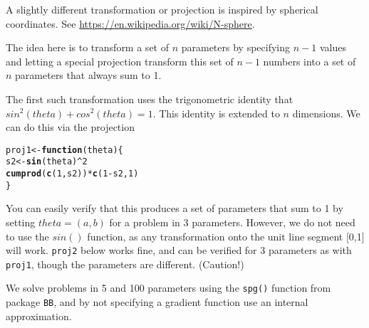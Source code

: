 \documentclass[11pt]{article}\usepackage[]{graphicx}\usepackage[]{color}
\makeatletter
\newcommand{\hlnum}[1]{\textcolor[rgb]{0.686,0.059,0.569}{#1}}%
\newcommand{\hlopt}[1]{\textcolor[rgb]{0,0,0}{#1}}%
\newcommand{\hlstd}[1]{\textcolor[rgb]{0.345,0.345,0.345}{#1}}%
\newcommand{\hlkwa}[1]{\textcolor[rgb]{0.161,0.373,0.58}{\textbf{#1}}}%
\newcommand{\hlkwb}[1]{\textcolor[rgb]{0.69,0.353,0.396}{#1}}%
\newcommand{\hlkwc}[1]{\textcolor[rgb]{0.333,0.667,0.333}{#1}}%
\newcommand{\hlkwd}[1]{\textcolor[rgb]{0.737,0.353,0.396}{\textbf{#1}}}%
\newenvironment{kframe}{%
 \def\at@end@of@kframe{}%
 \ifinner\ifhmode%
  \def\at@end@of@kframe{\end{minipage}}%
  \begin{minipage}{\columnwidth}%
 \fi\fi%
 \def\FrameCommand##1{\hskip\@totalleftmargin \hskip-\fboxsep
 \colorbox{shadecolor}{##1}\hskip-\fboxsep
     \hskip-\linewidth \hskip-\@totalleftmargin \hskip\columnwidth}%
 \MakeFramed {\advance\hsize-\width
   \@totalleftmargin\z@ \linewidth\hsize
   \@setminipage}}%
 {\par\unskip\endMakeFramed%
 \at@end@of@kframe}
\newenvironment{knitrout}{}{} %
\newcommand{\code}[1]{{\tt#1}}
\makeatother
\begin{document}
A slightly different transformation or projection is inspired by spherical coordinates.
See \url{https://en.wikipedia.org/wiki/N-sphere}.

The idea here is to transform a set of $n$ parameters by specifying $n-1$ values and
letting a special projection transform this set of $n-1$ numbers into a set of $n$ parameters
that always sum to 1. 

The first such transformation uses the trigonometric identity that $sin^2(theta) + cos^2(theta) =1$.
This identity is extended to $n$ dimensions. We can do this via the projection

\begin{knitrout}\scriptsize
{}\color{fgcolor}\begin{kframe}
\begin{alltt}
\hlstd{proj1} \hlkwb{<-} \hlkwa{function}\hlstd{(}\hlkwc{theta}\hlstd{) \{}
   \hlstd{s2} \hlkwb{<-} \hlkwd{sin}\hlstd{(theta)}\hlopt{^}\hlnum{2}
    \hlkwd{cumprod}\hlstd{(}\hlkwd{c}\hlstd{(}\hlnum{1}\hlstd{, s2))} \hlopt{*} \hlkwd{c}\hlstd{(}\hlnum{1}\hlopt{-}\hlstd{s2,} \hlnum{1}\hlstd{)}
\hlstd{\}}
\end{alltt}
\end{kframe}
\end{knitrout}

You can easily verify that this produces a set of parameters that sum to 1 by setting
$theta = (a,b)$ for a problem in 3 parameters. However, we do not need to use the 
$sin()$ function, as any transformation onto the unit line segment [0,1] will work.
\code{proj2} below works fine, and can be verified for 3 parameters as with \code{proj1},
though the parameters are different. (Caution!)

We solve problems in 5 and 100 parameters using the \code{spg()} function from package
\code{BB}, and by not specifying a gradient function use an internal approximation.
\end{document}
